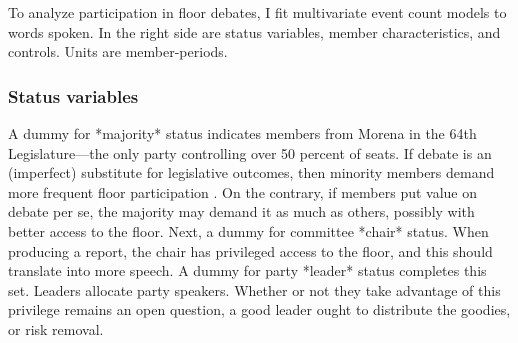 \documentclass[letter,12pt]{article}
\begin{document}









To analyze participation in floor debates, I fit multivariate event count models to words spoken. In the right side are status variables, member characteristics, and controls. Units are member-periods. 

    \subsubsection{Status variables}

A dummy for *majority* status indicates members from Morena in the 64th Legislature---the only party controlling over 50 percent of seats. If debate is an (imperfect) substitute for legislative outcomes, then minority members demand more frequent floor participation \citep{proksch-slapin2015book}. On the contrary, if members put value on debate per se, the majority may demand it as much as others, possibly with better access to the floor. Next, a dummy for committee *chair* status. When producing a report, the chair has privileged access to the floor, and this should translate into more speech. A dummy for party *leader* status completes this set. Leaders allocate party speakers. Whether or not they take advantage of this privilege remains an open question, a good leader ought to distribute the goodies, or risk removal. 
\end{document}
